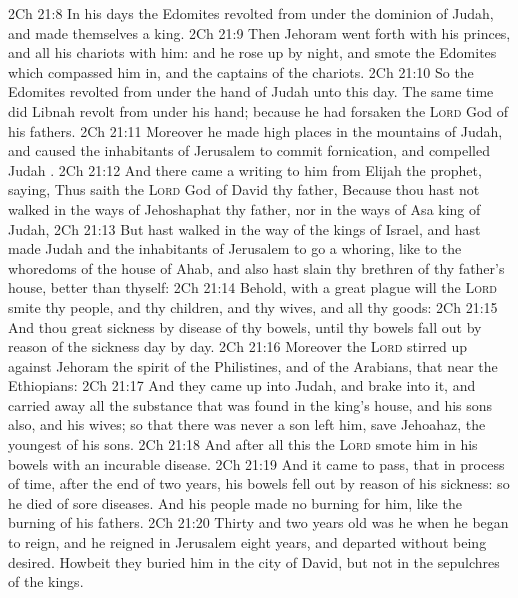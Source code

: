 \vs 2Ch 21:8 In his days the Edomites revolted from under the dominion of Judah, and made themselves a king.
\vs 2Ch 21:9 Then Jehoram went forth with his princes, and all his chariots with him: and he rose up by night, and smote the Edomites which compassed him in, and the captains of the chariots.
\vs 2Ch 21:10 So the Edomites revolted from under the hand of Judah unto this day. The same time  did Libnah revolt from under his hand; because he had forsaken the \textsc{Lord} God of his fathers.
\vs 2Ch 21:11 Moreover he made high places in the mountains of Judah, and caused the inhabitants of Jerusalem to commit fornication, and compelled Judah .
\vs 2Ch 21:12 And there came a writing to him from Elijah the prophet, saying, Thus saith the \textsc{Lord} God of David thy father, Because thou hast not walked in the ways of Jehoshaphat thy father, nor in the ways of Asa king of Judah,
\vs 2Ch 21:13 But hast walked in the way of the kings of Israel, and hast made Judah and the inhabitants of Jerusalem to go a whoring, like to the whoredoms of the house of Ahab, and also hast slain thy brethren of thy father's house,  better than thyself:
\vs 2Ch 21:14 Behold, with a great plague will the \textsc{Lord} smite thy people, and thy children, and thy wives, and all thy goods:
\vs 2Ch 21:15 And thou  great sickness by disease of thy bowels, until thy bowels fall out by reason of the sickness day by day.
\vs 2Ch 21:16 Moreover the \textsc{Lord} stirred up against Jehoram the spirit of the Philistines, and of the Arabians, that  near the Ethiopians:
\vs 2Ch 21:17 And they came up into Judah, and brake into it, and carried away all the substance that was found in the king's house, and his sons also, and his wives; so that there was never a son left him, save Jehoahaz, the youngest of his sons.
\vs 2Ch 21:18 And after all this the \textsc{Lord} smote him in his bowels with an incurable disease.
\vs 2Ch 21:19 And it came to pass, that in process of time, after the end of two years, his bowels fell out by reason of his sickness: so he died of sore diseases. And his people made no burning for him, like the burning of his fathers.
\vs 2Ch 21:20 Thirty and two years old was he when he began to reign, and he reigned in Jerusalem eight years, and departed without being desired. Howbeit they buried him in the city of David, but not in the sepulchres of the kings.
